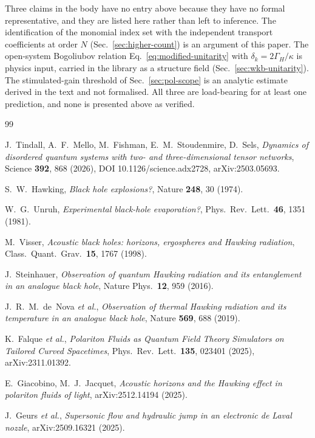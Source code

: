 \documentclass[aps,prd,reprint,nofootinbib,superscriptaddress]{revtex4-2}
\begin{document}
Three claims in the body have no entry above because they have no formal
representative, and they are listed here rather than left to inference.
The identification of the monomial index set with the independent
transport coefficients at order $N$ (Sec.~\ref{sec:higher-count}) is an
argument of this paper. The open-system Bogoliubov relation
Eq.~\eqref{eq:modified-unitarity} with $\delta_k = 2\Gamma_H/\kappa$ is
physics input, carried in the library as a structure field
(Sec.~\ref{sec:wkb-unitarity}). The stimulated-gain threshold of
Sec.~\ref{sec:pol-scope} is an analytic estimate derived in the text and
not formalised. All three are load-bearing for at least one prediction,
and none is presented above as verified.

\begin{thebibliography}{99}

J.~Tindall, A.~F.~Mello, M.~Fishman, E.~M.~Stoudenmire, D.~Sels,
\emph{Dynamics of disordered quantum systems with two- and
three-dimensional tensor networks},
Science \textbf{392}, 868 (2026),
DOI 10.1126/science.adx2728, arXiv:2503.05693.

S.~W.~Hawking,
\emph{Black hole explosions?},
Nature \textbf{248}, 30 (1974).

W.~G.~Unruh,
\emph{Experimental black-hole evaporation?},
Phys.~Rev.~Lett.~\textbf{46}, 1351 (1981).

M.~Visser,
\emph{Acoustic black holes: horizons, ergospheres and Hawking
radiation},
Class.~Quant.~Grav.~\textbf{15}, 1767 (1998).

J.~Steinhauer,
\emph{Observation of quantum Hawking radiation and its entanglement
in an analogue black hole},
Nature Phys.~\textbf{12}, 959 (2016).

J.~R.~M.~de~Nova \emph{et al.},
\emph{Observation of thermal Hawking radiation and its temperature
in an analogue black hole},
Nature \textbf{569}, 688 (2019).

K.~Falque \emph{et al.},
\emph{Polariton Fluids as Quantum Field Theory Simulators on Tailored
Curved Spacetimes},
Phys.~Rev.~Lett.~\textbf{135}, 023401 (2025), arXiv:2311.01392.

E.~Giacobino, M.~J.~Jacquet,
\emph{Acoustic horizons and the Hawking effect in polariton
fluids of light},
arXiv:2512.14194 (2025).

J.~Geurs \emph{et al.},
\emph{Supersonic flow and hydraulic jump in an electronic de Laval
nozzle},
arXiv:2509.16321 (2025).


\end{thebibliography}
\end{document}
